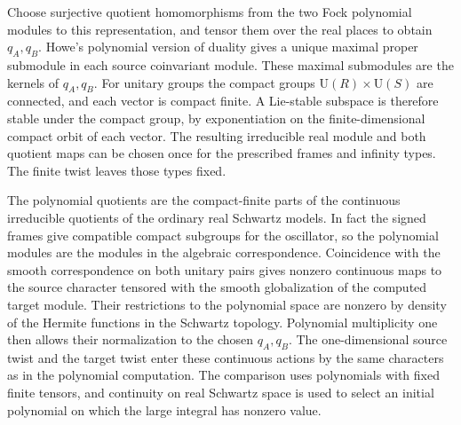 Choose surjective quotient homomorphisms from the two Fock
polynomial modules to this representation, and tensor them
over the real places to obtain \(q_A,q_B\).
Howe's polynomial version of duality gives a unique maximal
proper submodule in each source coinvariant module. These
maximal submodules are the kernels of \(q_A,q_B\).
For unitary groups the compact groups
\(\mathrm U(R)\times\mathrm U(S)\) are connected, and each
vector is compact finite. A Lie-stable subspace is therefore
stable under the compact group, by exponentiation on the
finite-dimensional compact orbit of each vector.
The resulting irreducible real module and both quotient
maps can be chosen once for the prescribed frames and
infinity types. The finite twist leaves those types fixed.
\cite[Theorem~2.1]{p2flip-howe-real}

The polynomial quotients are the compact-finite parts
of the continuous irreducible quotients of the ordinary
real Schwartz models. In fact the signed frames give
compatible compact subgroups for the oscillator, so
the polynomial modules are the modules in the
algebraic correspondence. Coincidence with the smooth
correspondence on both unitary pairs gives nonzero
continuous maps to the source character tensored
with the smooth globalization of the computed target
module. Their restrictions to the polynomial space
are nonzero by density of the Hermite functions in
the Schwartz topology. Polynomial multiplicity one
then allows their normalization to the chosen
\(q_A,q_B\). The one-dimensional source twist and
the target twist enter these continuous actions by
the same characters as in the polynomial computation.
The comparison uses polynomials with fixed finite
tensors, and continuity on real Schwartz space is
used to select an initial polynomial on which the
large integral has nonzero value.
\cite[Proposition~5.1]{bao-sun-smooth-theta}
\cite[Theorems~1 and~2.1]{p2flip-howe-real}

